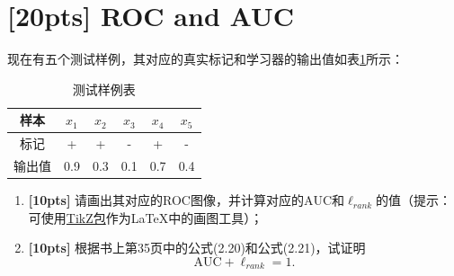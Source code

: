 \documentclass[a4paper,UTF8]{article}
\numberwithin{equation}{section}
\begin{document}
\newpage
\section{[20pts] ROC and AUC}
现在有五个测试样例，其对应的真实标记和学习器的输出值如表\ref{table:roc}所示：
\begin{table}[!h]
	\centering
	\caption{测试样例表} \vspace{2mm}\label{table:roc}
	\begin{tabular}{c|c c c c c}\hline
		样本 & $x_1$ & $x_2$ & $x_3$  & $x_4$  & $x_5$ \\
		\hline
		标记 & +  & + &  - &  +  & -\\
		\hline
		输出值 & 0.9  & 0.3 &  0.1 &  0.7  & 0.4\\
		\hline
	\end{tabular}
\end{table}
\begin{enumerate}[ {(}1{)}]
\item \textbf{[10pts]} 请画出其对应的ROC图像，并计算对应的$\mbox{AUC}$和$\ell_{rank}$的值（提示：可使用\href{https://en.wikibooks.org/wiki/LaTeX/PGF/TikZ}{TikZ包}作为\LaTeX 中的画图工具）；
\item \textbf{[10pts]} 根据书上第35页中的公式(2.20)和公式(2.21)，试证明\[\mbox{AUC}+\ell_{rank}=1.\]
\end{enumerate}
\end{document}
